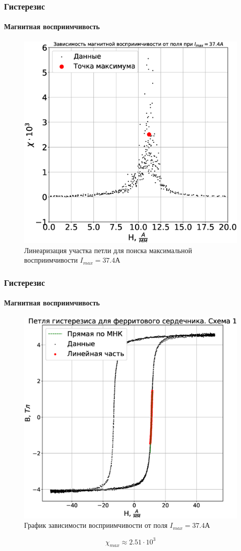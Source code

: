 \documentclass[8pt,pdf,hyperref={unicode}]{beamer}
\begin{document}
	\begin{frame}
		\frametitle{Гистерезис}
		\framesubtitle{Магнитная восприимчивость}
		\begin{center}
			\begin{figure}[h!]
				\centering
				\includegraphics[width=.5\linewidth]{Lab2_13.eps}
				\caption{Линеаризация участка петли для поиска максимальной восприимчивости $I_{max} = 37.4$А}
				\label{fig:3}
			\end{figure}
		\end{center}
	\end{frame}
	
	\begin{frame}
		\frametitle{Гистерезис}
		\framesubtitle{Магнитная восприимчивость}
		\begin{center}
			\begin{figure}[h!]
				\centering
				\includegraphics[width=.45\linewidth]{Lab2_12.eps}
				\caption{График зависимости восприимчивости от поля $I_{max} = 37.4$А}
				\label{fig:3}
			\end{figure}
			\begin{equation}
			\chi_{max} \approx 2.51 \cdot 10^3
			\end{equation}
		\end{center}
	\end{frame}
\end{document}
